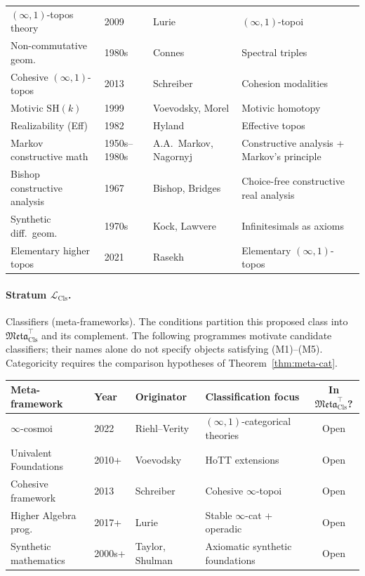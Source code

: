 \documentclass[11pt]{article}
\theoremstyle{plain}
\theoremstyle{definition}
\newcommand{\Meta}{\mathfrak{Meta}}
\newcommand{\LCls}{\mathcal{L}_{\mathrm{Cls}}}
\begin{document}
\begin{longtable}{@{}p{3.8cm}l p{4cm} p{4.6cm}@{}}
$(\infty, 1)$-topos theory & 2009 & Lurie & $(\infty, 1)$-topoi \\
Non-commutative geom.\ & 1980s & Connes & Spectral triples \\
Cohesive $(\infty, 1)$-topos & 2013 & Schreiber & Cohesion modalities \\
Motivic $\mathrm{SH}(k)$ & 1999 & Voevodsky, Morel & Motivic homotopy \\
Realizability (Eff) & 1982 & Hyland & Effective topos \\
Markov constructive math & 1950s--1980s & A.A.~Markov, Nagornyj & Constructive analysis + Markov's principle \\
Bishop constructive analysis & 1967 & Bishop, Bridges & Choice-free constructive real analysis \\
Synthetic diff.~geom.\ & 1970s & Kock, Lawvere & Infinitesimals as axioms \\
Elementary higher topos & 2021 & Rasekh & Elementary $(\infty, 1)$-topos \\
\bottomrule
\end{longtable}

\paragraph{Stratum $\LCls$.} Classifiers (meta-frameworks). The conditions partition this proposed class into $\Meta_{\mathrm{Cls}}^{\top}$ and its complement. The following programmes motivate candidate classifiers; their names alone do not specify objects satisfying (M1)--(M5). Categoricity requires the comparison hypotheses of Theorem~\ref{thm:meta-cat}.

\begin{longtable}{@{}p{3.3cm}l p{3cm} p{4.4cm}c@{}}
\toprule
Meta-framework & Year & Originator & Classification focus & In $\Meta_{\mathrm{Cls}}^{\top}$? \\ \midrule
$\infty$-cosmoi & 2022 & Riehl--Verity & $(\infty, 1)$-categorical theories & Open \\
Univalent Foundations & 2010+ & Voevodsky & HoTT extensions & Open \\
Cohesive framework & 2013 & Schreiber & Cohesive $\infty$-topoi & Open \\
Higher Algebra prog.\ & 2017+ & Lurie & Stable $\infty$-cat + operadic & Open \\
Synthetic mathematics & 2000s+ & Taylor, Shulman & Axiomatic synthetic foundations & Open \\
\bottomrule
\end{longtable}
\end{document}
